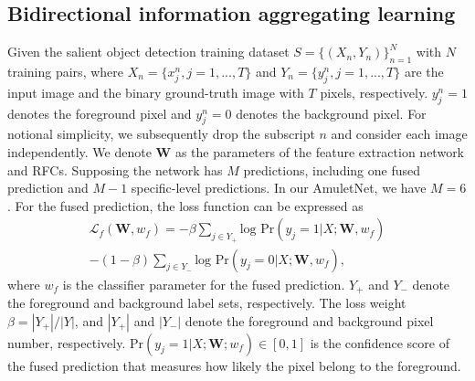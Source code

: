 \documentclass[10pt,twocolumn,letterpaper]{article}
\begin{document}
\subsection{Bidirectional information aggregating learning}
Given the salient object detection training dataset $ S=\{(X_n,Y_n)\}^{N}_{n=1}$ with $N$ training pairs, where $X_n =
\{x^n_j,j = 1,...,T\}$ and $Y_n = \{y^n_j,j = 1,...,T\}$ are the input image and the binary ground-truth image with $T$ pixels, respectively.
$y^n_j = 1$ denotes the foreground pixel and $y^n_j = 0$ denotes the background pixel.
For notional simplicity, we subsequently drop the subscript $n$ and consider each image independently.
We denote $\textbf{W}$ as the parameters of the feature extraction network and RFCs.
Supposing the network has $M$ predictions, including one fused prediction and $M-1$ specific-level predictions. In our AmuletNet, we have $M =6$.
For the fused prediction, the loss function can be expressed as
\begin{equation}
  \label{equ:equ4}
\begin{aligned}
  \mathcal{L}_f(\textbf{W},w_f)= - \beta \sum_{j\in Y_{+}} \text{log~Pr}(y_{j}=1|X;\textbf{W},w_f)\\
  -(1-\beta)\sum_{j\in Y_{-}} \text{log~Pr}(y_{j}=0|X;\textbf{W},w_f),
\end{aligned}
\end{equation}
where $w_f$ is the classifier parameter for the fused prediction.
$Y_{+}$ and $Y_{-}$ denote the foreground and background label sets, respectively.
The loss weight $\beta = |Y_{+}|/|Y|$, and $|Y_{+}|$ and $|Y_{-}|$ denote the foreground and background pixel number, respectively.
Pr$(y_j =1|X;\textbf{W};w_f)\in [0,1]$ is the confidence score of the fused prediction that measures how likely the pixel belong to the foreground.
\end{document}
